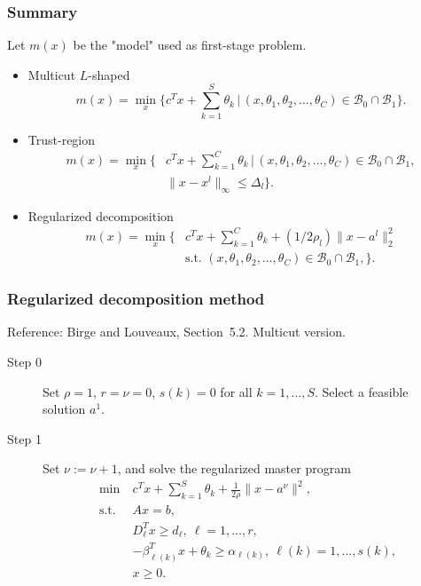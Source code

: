 \documentclass{beamer}
\begin{document}
\begin{frame}
\frametitle{Summary}

Let $m(x)$ be the "model" used as first-stage problem.
\begin{itemize}
\item
{\red Multicut $L$-shaped}
\[
m(x) = \min_x \Big\lbrace c^Tx + \sum_{k = 1}^S \theta_k \,|\, (x, \theta_1,
\theta_2,\ldots, \theta_C) \in \mathcal{B}_0 \cap \mathcal{B}_1
\Big\rbrace.
\]
\item
{\red Trust-region}
\begin{align*}
m(x)
= \min_x \Big\lbrace &  c^Tx + \sum_{k = 1}^C \theta_k \,|\, (x, \theta_1,
\theta_2,\ldots, \theta_C) \in \mathcal{B}_0 \cap \mathcal{B}_1, \\
& \| x-x^l \|_{\infty} \leq \Delta_l \Big\rbrace.
\end{align*}
\item
{\red Regularized decomposition}
\begin{align*}
m(x) = \min_x \Big\lbrace & c^Tx + \sum_{k = 1}^C \theta_k + (1/2\rho_l)
\| x-a^l \|_2^2 \\ & \mbox{s.t. } (x, \theta_1, \theta_2,\ldots,
\theta_C) \in \mathcal{B}_0 \cap \mathcal{B}_1, \Big\rbrace.
\end{align*}
\end{itemize}

\end{frame}

\begin{frame}
\frametitle{Regularized decomposition method}

{\red Reference: Birge and Louveaux, Section~5.2}. Multicut version.

\begin{description}
\item[Step 0]
Set $\rho = 1$, $r = \nu = 0$, $s(k) = 0$ for all $k = 1,\ldots,S$.
Select a feasible solution $a^1$.
\item[Step 1]
Set $\nu := \nu+1$, and solve the regularized master program
\begin{align*}
\min\ & c^Tx + \sum_{k = 1}^S \theta_k + \frac{1}{2\rho} \| x - a^{\nu}
\|^2,\\
\mbox{s.t. } & Ax = b,\\
& D_{\ell}^Tx \geq d_{\ell},\ \ell = 1,\ldots,r, \\
& -\beta^T_{\ell(k)} x + \theta_k \geq \alpha_{\ell(k)},\ \ell(k) =
1,\ldots,s(k),\\
& x \geq 0.
\end{align*}
\end{description}

\end{frame}
\end{document}

